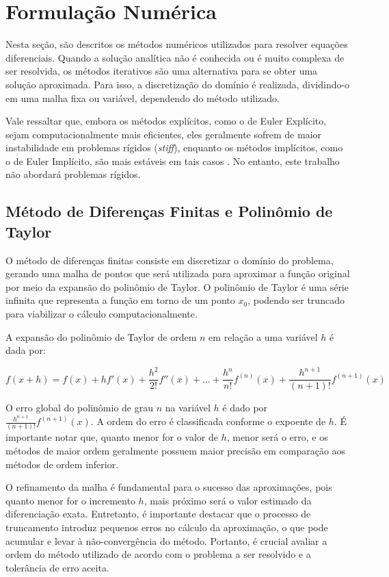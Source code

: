 \section{Formulação Numérica}\label{sec:formnumer}

Nesta seção, são descritos os métodos numéricos utilizados para resolver equações diferenciais. Quando a solução analítica não é conhecida ou é muito complexa de ser resolvida, os métodos iterativos são uma alternativa para se obter uma solução aproximada. Para isso, a discretização do domínio é realizada, dividindo-o em uma malha fixa ou variável, dependendo do método utilizado.

Vale ressaltar que, embora os métodos explícitos, como o de Euler Explícito, sejam computacionalmente mais eficientes, eles geralmente sofrem de maior instabilidade em problemas rígidos (\emph{stiff}), enquanto os métodos implícitos, como o de Euler Implícito, são mais estáveis em tais casos \cite{ascher2008numerical}. No entanto, este trabalho não abordará problemas rígidos.


\subsection{Método de Diferenças Finitas e Polinômio de Taylor} \label{sec:finite_differences}

O método de diferenças finitas consiste em discretizar o domínio do problema, gerando uma malha de pontos que será utilizada para aproximar a função original por meio da expansão do polinômio de Taylor. O polinômio de Taylor é uma série infinita que representa a função em torno de um ponto $x_0$, podendo ser truncado para viabilizar o cálculo computacionalmente.

A expansão do polinômio de Taylor de ordem $n$ em relação a uma variável $h$ é dada por:

\begin{equation*} \label{taylor}
f(x+h)= f(x) + hf'(x) + \frac{h^2}{2!}f''(x)+...+ \frac{h^n}{n!}f^{(n)}(x) + \frac{h^{n+1}}{(n+1)!}f^{(n+1)}(x)
\end{equation*}

O erro global do polinômio de grau $n$ na variável $h$ é dado por $\frac{h^{n+1}}{(n+1)!}f^{(n+1)}(x)$. A ordem do erro é classificada conforme o expoente de $h$. É importante notar que, quanto menor for o valor de $h$, menor será o erro, e os métodos de maior ordem geralmente possuem maior precisão em comparação aos métodos de ordem inferior.

O refinamento da malha é fundamental para o sucesso das aproximações, pois quanto menor for o incremento $h$, mais próximo será o valor estimado da diferenciação exata. Entretanto, é importante destacar que o processo de truncamento introduz pequenos erros no cálculo da aproximação, o que pode acumular e levar à não-convergência do método. Portanto, é crucial avaliar a ordem do método utilizado de acordo com o problema a ser resolvido e a tolerância de erro aceita.


